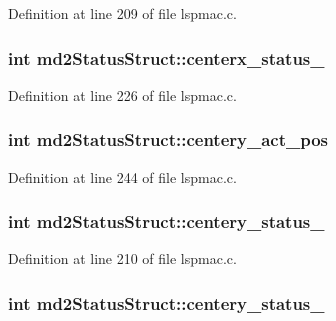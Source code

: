 Definition at line 209 of file lspmac.c.\hypertarget{structmd2StatusStruct_ae4fad6debe138ed7815d463e83f8d0f6}{
\subsubsection[{centerx\_\-status\_\-2}]{\setlength{\rightskip}{0pt plus 5cm}int {\bf md2StatusStruct::centerx\_\-status\_}}}
\label{structmd2StatusStruct_ae4fad6debe138ed7815d463e83f8d0f6}


Definition at line 226 of file lspmac.c.\hypertarget{structmd2StatusStruct_a6be71a92a599d490ca808af8c7e7faa0}{
\subsubsection[{centery\_\-act\_\-pos}]{\setlength{\rightskip}{0pt plus 5cm}int {\bf md2StatusStruct::centery\_\-act\_\-pos}}}
\label{structmd2StatusStruct_a6be71a92a599d490ca808af8c7e7faa0}


Definition at line 244 of file lspmac.c.\hypertarget{structmd2StatusStruct_a57f65ebe28ef88f1c632d9f35d9167eb}{
\subsubsection[{centery\_\-status\_\-1}]{\setlength{\rightskip}{0pt plus 5cm}int {\bf md2StatusStruct::centery\_\-status\_}}}
\label{structmd2StatusStruct_a57f65ebe28ef88f1c632d9f35d9167eb}


Definition at line 210 of file lspmac.c.\hypertarget{structmd2StatusStruct_aa242098c185cce8f852cd6e081ef0b1d}{
\subsubsection[{centery\_\-status\_\-2}]{\setlength{\rightskip}{0pt plus 5cm}int {\bf md2StatusStruct::centery\_\-status\_}}}
\label{structmd2StatusStruct_aa242098c185cce8f852cd6e081ef0b1d}



